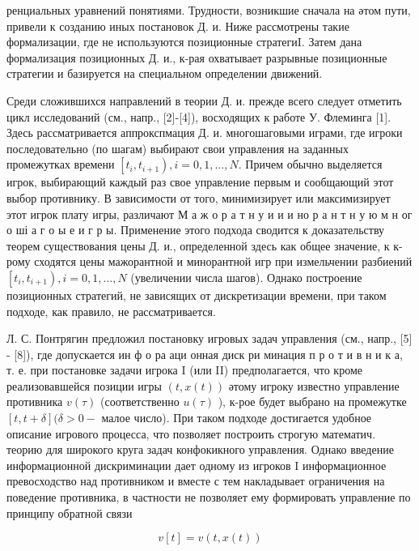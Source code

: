 \documentclass[10pt]{article}
\begin{document}
ренциальных уравнений понятиями. Трудности, возникшие сначала на әтом пути, привели к созданию иных постановок Д. и. Ниже рассмотрены такие формализации, где не используются позиционные стратегиI. Затем дана формализация позиционных Д. и., к-рая охватывает разрывные позиционные стратегии и базируется на специальном определении движений.



Среди сложившихся направлений в теории Д. и. прежде всего следует отметить цикл исследований (см., напр., [2]-[4]), восходящих к работе У. Флеминга [1]. Здесь рассматривается аппрокспмация Д. и. многошаговыми играми, где игроки последовательно (по шагам) выбирают свои управления на заданных промежутках времени $\left[t_{i}, t_{i+1}\right), i=0,1, \ldots, N$. Причем обычно выделяется игрок, выбирающий каждый раз свое управление первым и сообщающий этот выбор противнику. В зависимости от того, минимизирует или максимизирует этот игрок плату игры, различают М а ж о р а т н у и и и но р а н т н у ю м н ог о ші а г о ы е и г р ы. Применение этого подхода сводится к доказательству теорем существования цены Д. и., определенной здесь как общее значение, к к-рому сходятся цены мажорантной и минорантной игр при измельчении разбиений $\left[t_{i}, t_{i+1}\right), i=0,1, \ldots, N$ (увеличении числа шагов). Однако построение позиционных стратегий, не зависящих от дискретизации времени, при таком подходе, как правило, не рассматривается.



Л. С. Понтрягин предложил постановку игровых задач управления (см., напр., [5] - [8]), где допускается ин ф о ра аци онная диск ри минация п р о т и в н и к а, т. е. при постановке задачи игрока I (или II) предполагается, что кроме реализовавшейся позиции игры $(t, x(t))$ әтому игроку известно управление противника $v(\tau)$ (соответственно $u(\tau)$ ), к-рое будет выбрано на промежутке $[t, t+\delta](\delta>0-$ малое число). При таком подходе достигается удобное описание игрового процесса, что позволяет построить строгую математич. теорию для широкого круга задач конфокикного управления. Однако введение информационной дискриминации дает одному из игроков I информационное превосходство над противником и вместе с тем накладывает ограничения на поведение противника, в частности не позволяет ему формировать управление по принципу обратной связи



\[

v[t]=v(t, x(t))

\]
\end{document}
